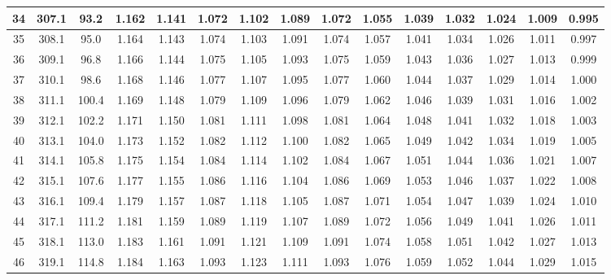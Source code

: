 \documentclass[12pt,a4paper,twoside]{article}
\begin{document}
\begin{center}
\begin{longtable}{ c c c | c c c c c c c c c c c c}
 34 & 307.1 & 93.2 & 1.162 & 1.141 & 1.072 & 1.102 & 1.089 & 1.072 & 1.055 & 1.039 & 1.032 & 1.024 & 1.009 & 0.995 \\ \hline   
 
 35 & 308.1 & 95.0 & 1.164 & 1.143 & 1.074 & 1.103 & 1.091 & 1.074 & 1.057 & 1.041 & 1.034 & 1.026 & 1.011 & 0.997 \\ \hline   
 
 36 & 309.1 & 96.8 & 1.166 & 1.144 & 1.075 & 1.105 & 1.093 & 1.075 & 1.059 & 1.043 & 1.036 & 1.027 & 1.013 & 0.999 \\ \hline   
 
 37 & 310.1 & 98.6 & 1.168 & 1.146 & 1.077 & 1.107 & 1.095 & 1.077 & 1.060 & 1.044 & 1.037 & 1.029 & 1.014 & 1.000 \\ \hline   
 
 38 & 311.1 & 100.4 & 1.169 & 1.148 & 1.079 & 1.109 & 1.096 & 1.079 & 1.062 & 1.046 & 1.039 & 1.031 & 1.016 & 1.002 \\ \hline   
 
 39 & 312.1 & 102.2 & 1.171 & 1.150 & 1.081 & 1.111 & 1.098 & 1.081 & 1.064 & 1.048 & 1.041 & 1.032 & 1.018 & 1.003 \\ \hline   
 
 40 & 313.1 & 104.0 & 1.173 & 1.152 & 1.082 & 1.112 & 1.100 & 1.082 & 1.065 & 1.049 & 1.042 & 1.034 & 1.019 & 1.005 \\ \hline   
 
 41 & 314.1 & 105.8 & 1.175 & 1.154 & 1.084 & 1.114 & 1.102 & 1.084 & 1.067 & 1.051 & 1.044 & 1.036 & 1.021 & 1.007 \\ \hline   
 
 42 & 315.1 & 107.6 & 1.177 & 1.155 & 1.086 & 1.116 & 1.104 & 1.086 & 1.069 & 1.053 & 1.046 & 1.037 & 1.022 & 1.008 \\ \hline   
 
 43 & 316.1 & 109.4 & 1.179 & 1.157 & 1.087 & 1.118 & 1.105 & 1.087 & 1.071 & 1.054 & 1.047 & 1.039 & 1.024 & 1.010 \\ \hline   
 
 44 & 317.1 & 111.2 & 1.181 & 1.159 & 1.089 & 1.119 & 1.107 & 1.089 & 1.072 & 1.056 & 1.049 & 1.041 & 1.026 & 1.011 \\ \hline   
 
 45 & 318.1 & 113.0 & 1.183 & 1.161 & 1.091 & 1.121 & 1.109 & 1.091 & 1.074 & 1.058 & 1.051 & 1.042 & 1.027 & 1.013 \\ \hline   
 
 46 & 319.1 & 114.8 & 1.184 & 1.163 & 1.093 & 1.123 & 1.111 & 1.093 & 1.076 & 1.059 & 1.052 & 1.044 & 1.029 & 1.015 \\ \hline   
 

\end{longtable}
\end{center}
\end{document}
